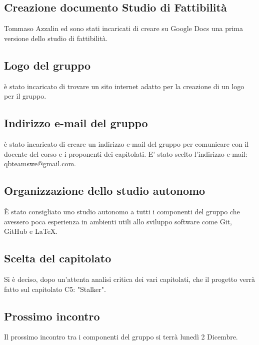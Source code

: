 \subsection{Creazione documento Studio di Fattibilità}
Tommaso Azzalin ed \CE sono stati incaricati di creare su Google Docs una prima versione dello studio di fattibilità.

\subsection{Logo del gruppo}
\DF è stato incaricato di trovare un sito internet adatto per la creazione di un logo per il gruppo.

\subsection{Indirizzo e-mail del gruppo}
\SE è stato incaricato di creare un indirizzo e-mail del gruppo per comunicare con il docente del corso e i proponenti dei capitolati.
E' stato scelto l'indirizzo e-mail: qbteamswe@gmail.com.

\subsection{Organizzazione dello studio autonomo}
È stato consigliato uno studio autonomo a tutti i componenti del gruppo che avessero poca esperienza in ambienti utili allo sviluppo software come Git, GitHub e \LaTeX.\\

\subsection{Scelta del capitolato}
Si è deciso, dopo un'attenta analisi critica dei vari capitolati, che il progetto verrà fatto sul capitolato C5: "Stalker".

\subsection{Prossimo incontro}
Il prossimo incontro tra i componenti del gruppo si terrà lunedì 2 Dicembre.
\clearpage